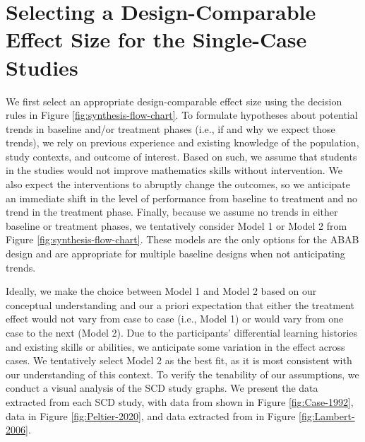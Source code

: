 \documentclass[
]{book}
\begin{document}
\hypertarget{selecting-a-design-comparable-effect-size-for-the-single-case-studies}{%
\section{Selecting a Design-Comparable Effect Size for the Single-Case Studies}\label{selecting-a-design-comparable-effect-size-for-the-single-case-studies}}

We first select an appropriate design-comparable effect size using the decision rules in Figure \ref{fig:synthesis-flow-chart}. To formulate hypotheses about potential trends in baseline and/or treatment phases (i.e., if and why we expect those trends), we rely on previous experience and existing knowledge of the population, study contexts, and outcome of interest. Based on such, we assume that students in the studies would not improve mathematics skills without intervention. We also expect the interventions to abruptly change the outcomes, so we anticipate an immediate shift in the level of performance from baseline to treatment and no trend in the treatment phase. Finally, because we assume no trends in either baseline or treatment phases, we tentatively consider Model 1 or Model 2 from Figure \ref{fig:synthesis-flow-chart}. These models are the only options for the ABAB design and are appropriate for multiple baseline designs when not anticipating trends.

Ideally, we make the choice between Model 1 and Model 2 based on our conceptual understanding and our a priori expectation that either the treatment effect would not vary from case to case (i.e., Model 1) or would vary from one case to the next (Model 2). Due to the participants' differential learning histories and existing skills or abilities, we anticipate some variation in the effect across cases. We tentatively select Model 2 as the best fit, as it is most consistent with our understanding of this context. To verify the tenability of our assumptions, we conduct a visual analysis of the SCD study graphs. We present the data extracted from each SCD study, with data from \citet{case1992Improving} shown in Figure \ref{fig:Case-1992}, \citet{peltier2020Effects} data in Figure \ref{fig:Peltier-2020}, and data extracted from \citet{lambert2006effects} in Figure \ref{fig:Lambert-2006}.
\end{document}

